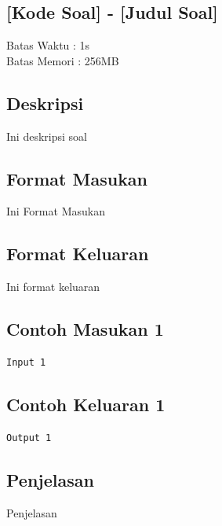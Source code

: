 \documentclass{article}
\begin{document}
\begin{center}
    \section*{[Kode Soal] - [Judul Soal]} %
    Batas Waktu : 1s \\  %
    Batas Memori :  256MB \\ %
\end{center}

\subsection*{Deskripsi}

Ini deskripsi soal

\subsection*{Format Masukan}

Ini Format Masukan

\subsection*{Format Keluaran}

Ini format keluaran
\\

\begin{multicols}{2}
\subsection*{Contoh Masukan 1}
\begin{lstlisting}
Input 1
\end{lstlisting}
\columnbreak
\subsection*{Contoh Keluaran 1}
\begin{lstlisting}
Output 1
\end{lstlisting}
\vfill
\null
\end{multicols}


\subsection*{Penjelasan}

Penjelasan

%
%
\end{document}
